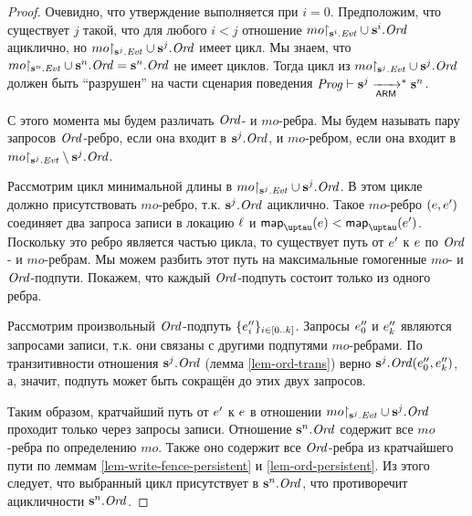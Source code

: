 \begin{proof}
  Очевидно, что утверждение выполняется при $i = 0$.
  Предположим, что существует $j$ такой, что для любого $i < j$ отношение
  $mo{\restriction_{\mathbf{s}^i.\mathit{Evt}}} \cup \mathbf{s}^i.\mathit{Ord}$ ациклично, но
  $mo{\restriction_{\mathbf{s}^j.\mathit{Evt}}} \cup \mathbf{s}^j.\mathit{Ord}$ имеет цикл.
  Мы знаем, что $mo{\restriction_{\mathbf{s}^n.\mathit{Evt}}} \cup \mathbf{s}^n.\mathit{Ord} = \mathbf{s}^n.\mathit{Ord}$ не имеет циклов.
  Тогда цикл из $mo{\restriction_{\mathbf{s}^j.\mathit{Evt}}} \cup \mathbf{s}^j.\mathit{Ord}$ должен быть ``разрушен''
  на части сценария поведения $\mathit{Prog} \vdash \mathbf{s}^j \xrightarrow[\mathsf{ARM}]{}^{*} \mathbf{s}^n$.
  
  С этого момента мы будем различать $\mathit{Ord}$- и $mo$-ребра.
  Мы будем называть пару запросов $\mathit{Ord}$-ребро, если она входит в $\mathbf{s}^j.\mathit{Ord}$,
  и  $mo$-ребром, если она входит в $mo{\restriction_{\mathbf{s}^j.\mathit{Evt}}} \setminus \mathbf{s}^j.\mathit{Ord}$.

Рассмотрим цикл минимальной длины в ${mo{\restriction_{\mathbf{s}^j.\mathit{Evt}}}} \cup \mathbf{s}^j.\mathit{Ord}$.
В этом цикле должно присутствовать $mo$-ребро, т.к. $\mathbf{s}^j.\mathit{Ord}$ ациклично.
Такое $mo$-ребро $(e, e')$ соединяет два запроса записи в локацию $\ell$ %
и $\taumapping(\e) < \taumapping(\e')$.
Поскольку это ребро является частью цикла, то существует путь от $e'$ к $e$ по
$\mathit{Ord}$- и $mo$-ребрам. Мы можем разбить этот путь на максимальные гомогенные $mo$- и $\mathit{Ord}$-подпути.
Покажем, что каждый $\mathit{Ord}$-подпуть состоит только из одного ребра.

Рассмотрим произвольный $\mathit{Ord}$-подпуть $\{e''_i\}_{i \in [0..k]}$.
Запросы $e''_0$ и $e''_k$ являются запросами записи, т.к. они связаны с другими подпутями
$mo$-ребрами.
По транзитивности отношения $\mathbf{s}^j.\mathit{Ord}$ (лемма \ref{lem-ord-trans})
верно $\mathbf{s}^j.\mathit{Ord}(e''_0, e''_k)$, а, значит, подпуть может быть сокращён до этих
двух запросов.

Таким образом, кратчайший путь от $e'$ к $e$ в отношении
${mo{\restriction_{\mathbf{s}^j.\mathit{Evt}}}} \cup \mathbf{s}^j.\mathit{Ord}$ проходит только через запросы записи.
Отношение $\mathbf{s}^n.\mathit{Ord}$ содержит все $mo$-ребра по определению $mo$. Также оно
содержит все $\mathit{Ord}$-ребра из кратчайшего пути по леммам \ref{lem-write-fence-persistent} и
\ref{lem-ord-persistent}. Из этого следует, что выбранный цикл присутствует в $\mathbf{s}^n.\mathit{Ord}$,
что противоречит ацикличности $\mathbf{s}^n.\mathit{Ord}$.
\end{proof}


